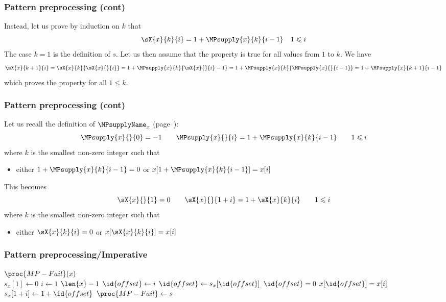 %
\begin{frame}
\frametitle{Pattern preprocessing (cont)}

Instead, let us prove by induction on \(k\) that
\[
\sX{x}{k}{i} = 1 + \MPsupply{x}{k}{i-1} \quad 1 \leqslant i
\]
The case \(k=1\) is the definition of \(s\). Let us then assume that
the property is true for all values from \(1\) to \(k\). We have
\[
  \sX{x}{k+1}{i} 
= \sX{x}{k}{\sX{x}{}{i}} 
= 1 + \MPsupply{x}{k}{\sX{x}{}{i}-1} 
= 1 + \MPsupply{x}{k}{\MPsupply{x}{}{i-1}}
= 1 + \MPsupply{x}{k+1}{i-1}
\]
which proves the property for all \(1 \leqslant k\).

\end{frame}

%
\begin{frame}
\frametitle{Pattern preprocessing (cont)}

Let us recall the definition of \(\MPsupplyName_{x}\) (page~\pageref{beta_def}):
\[
\MPsupply{x}{}{0} = -1 \qquad \MPsupply{x}{}{i} = 1 + \MPsupply{x}{k}{i-1}
\qquad 1 \leqslant i
\]
where \(k\) is the smallest non-zero integer such that
\begin{itemize}

  \item either \(1 + \MPsupply{x}{k}{i-1} = 0\) or
    \(x[1+\MPsupply{x}{k}{i-1}] = x[i]\)

\end{itemize}
This becomes
\[
\sX{x}{}{1} = 0 \qquad \sX{x}{}{1 + i} = 1 + \sX{x}{k}{i}
\qquad 1 \leqslant i
\]
where \(k\) is the smallest non-zero integer such that
\begin{itemize}

  \item either \(\sX{x}{k}{i} = 0\) or \(x[\sX{x}{k}{i}] = x[i]\)

\end{itemize}

\end{frame}

%
\begin{frame}
\frametitle{Pattern preprocessing/Imperative}

\begin{codebox}
\(\proc{MP-Fail}(x)\)\\
\li \(s_{x}[1] \gets 0\)
\li \For \(i \gets 1\) \To \(\len{x}-1\)
\li	\Do \(\id{offset} \gets i\)
\li     \Repeat
\li     \(\id{offset} \gets s_{x}[\id{offset}]\)
\li     \Until \(\id{offset} = 0\) \LogOr \(x[\id{offset}] = x[i]\)
\li	    \(s_{x}[1 + i] \gets 1 + \id{offset}\)
    \End
\li \(\proc{MP-Fail} \gets s\)
\end{codebox}

\end{frame}

